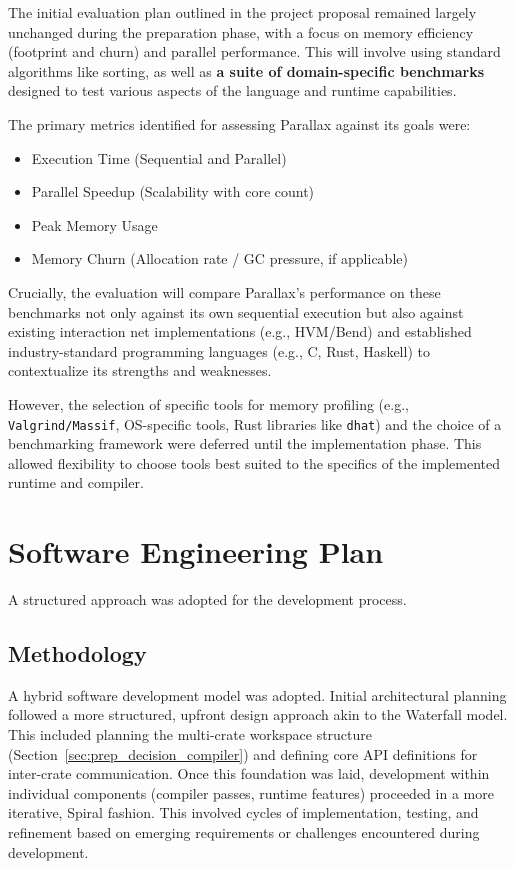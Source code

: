 The initial evaluation plan outlined in the project proposal remained largely unchanged during the preparation phase, with a focus on memory efficiency (footprint and churn) and parallel performance. This will involve using standard algorithms like sorting, as well as \textbf{a suite of domain-specific benchmarks} designed to test various aspects of the language and runtime capabilities. 

The primary metrics identified for assessing Parallax against its goals were:
\begin{itemize}
    \item Execution Time (Sequential and Parallel)
    \item Parallel Speedup (Scalability with core count)
    \item Peak Memory Usage
    \item Memory Churn (Allocation rate / GC pressure, if applicable)
\end{itemize}
Crucially, the evaluation will compare Parallax's performance on these benchmarks not only against its own sequential execution but also against existing interaction net implementations (e.g., HVM/Bend) and established industry-standard programming languages (e.g., C, Rust, Haskell) to contextualize its strengths and weaknesses.

However, the selection of specific tools for memory profiling (e.g., \texttt{Valgrind/Massif}, OS-specific tools, Rust libraries like \texttt{dhat}) and the choice of a benchmarking framework were deferred until the implementation phase. This allowed flexibility to choose tools best suited to the specifics of the implemented runtime and compiler.

\section{Software Engineering Plan}\label{sec:prep_software_eng}

A structured approach was adopted for the development process.

\subsection{Methodology}
A hybrid software development model was adopted. Initial architectural planning followed a more structured, upfront design approach akin to the Waterfall model. This included planning the multi-crate workspace structure (Section~\ref{sec:prep_decision_compiler}) and defining core API definitions for inter-crate communication. Once this foundation was laid, development within individual components (compiler passes, runtime features) proceeded in a more iterative, Spiral fashion. This involved cycles of implementation, testing, and refinement based on emerging requirements or challenges encountered during development.

